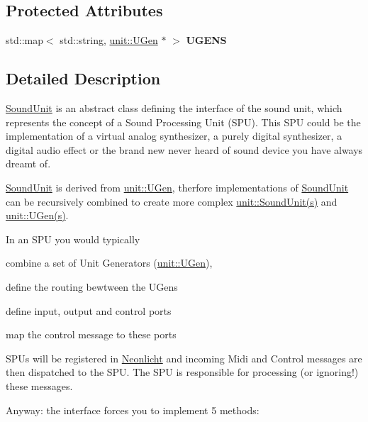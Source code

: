 \subsection*{Protected Attributes}
\begin{DoxyCompactItemize}
\item 
std\+::map$<$ std\+::string, \hyperlink{classunit_1_1UGen}{unit\+::\+U\+Gen} $\ast$ $>$ {\bfseries U\+G\+E\+NS}\hypertarget{classunit_1_1SoundUnit_a08f1485a5a06b0d458e99833f9207678}{}\label{classunit_1_1SoundUnit_a08f1485a5a06b0d458e99833f9207678}

\end{DoxyCompactItemize}


\subsection{Detailed Description}
\hyperlink{classunit_1_1SoundUnit}{Sound\+Unit} is an abstract class defining the interface of the sound unit, which represents the concept of a Sound Processing Unit (S\+PU). This S\+PU could be the implementation of a virtual analog synthesizer, a purely digital synthesizer, a digital audio effect or the brand new never heard of sound device you have always dreamt of.

\hyperlink{classunit_1_1SoundUnit}{Sound\+Unit} is derived from \hyperlink{classunit_1_1UGen}{unit\+::\+U\+Gen}, therfore implementations of \hyperlink{classunit_1_1SoundUnit}{Sound\+Unit} can be recursively combined to create more complex \hyperlink{classunit_1_1SoundUnit}{unit\+::\+Sound\+Unit(s)} and \hyperlink{classunit_1_1UGen}{unit\+::\+U\+Gen(s)}.

In an S\+PU you would typically


\begin{DoxyItemize}
\item combine a set of Unit Generators (\hyperlink{classunit_1_1UGen}{unit\+::\+U\+Gen}),
\item define the routing bewtween the U\+Gens
\item define input, output and control ports
\item map the control message to these ports
\end{DoxyItemize}

S\+P\+Us will be registered in \hyperlink{classNeonlicht}{Neonlicht} and incoming Midi and Control messages are then dispatched to the S\+PU. The S\+PU is responsible for processing (or ignoring!) these messages.

Anyway\+: the interface forces you to implement 5 methods\+:


